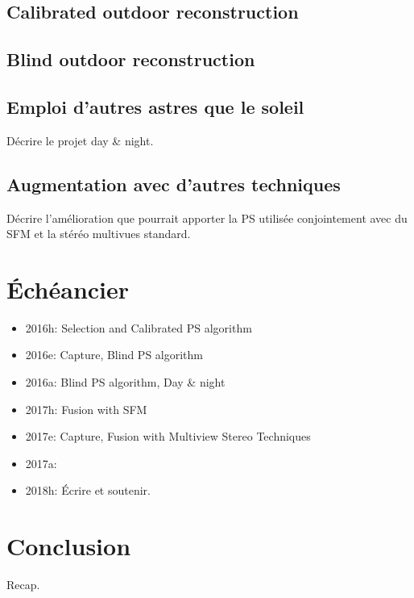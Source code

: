 \documentclass{report}
\begin{document}
\section{Calibrated outdoor reconstruction}

\section{Blind outdoor reconstruction}

\section{Emploi d'autres astres que le soleil}

Décrire le projet day \& night.

\section{Augmentation avec d'autres techniques}

Décrire l'amélioration que pourrait apporter la PS utilisée conjointement avec du SFM et la stéréo multivues standard.


\chapter{Échéancier}

\begin{itemize}
	\item 2016h: Selection and Calibrated PS algorithm
	\item 2016e: Capture, Blind PS algorithm  
	\item 2016a: Blind PS algorithm, Day \& night
	\item 2017h: Fusion with SFM
	\item 2017e: Capture, Fusion with Multiview Stereo Techniques
	\item 2017a: 
	\item 2018h: Écrire et soutenir.
\end{itemize}


\chapter{Conclusion}\label{conclusion}

Recap.

{\small
%

}
\end{document}
